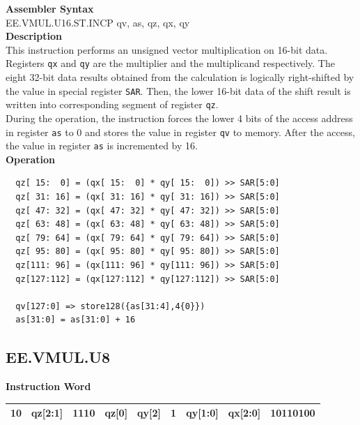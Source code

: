 \textbf{Assembler Syntax} \\
EE.VMUL.U16.ST.INCP qv, as, qz, qx, qy \\
\textbf{Description} \\
This instruction performs an unsigned vector multiplication on 16-bit data. Registers \lstinline{qx} and \lstinline{qy} are the multiplier and the multiplicand respectively. The eight 32-bit data results obtained from the calculation is logically right-shifted by the value in special register \lstinline{SAR}. Then, the lower 16-bit data of the shift result is written into corresponding segment of register \lstinline{qz}. \\ During the operation, the instruction forces the lower 4 bits of the access address in register \lstinline{as} to 0 and stores the value in register \lstinline{qv} to memory. After the access, the value in register \lstinline{as} is incremented by 16.\\
\textbf{Operation}
\begin{lstlisting}
  qz[ 15:  0] = (qx[ 15:  0] * qy[ 15:  0]) >> SAR[5:0]
  qz[ 31: 16] = (qx[ 31: 16] * qy[ 31: 16]) >> SAR[5:0]
  qz[ 47: 32] = (qx[ 47: 32] * qy[ 47: 32]) >> SAR[5:0]
  qz[ 63: 48] = (qx[ 63: 48] * qy[ 63: 48]) >> SAR[5:0]
  qz[ 79: 64] = (qx[ 79: 64] * qy[ 79: 64]) >> SAR[5:0]
  qz[ 95: 80] = (qx[ 95: 80] * qy[ 95: 80]) >> SAR[5:0]
  qz[111: 96] = (qx[111: 96] * qy[111: 96]) >> SAR[5:0]
  qz[127:112] = (qx[127:112] * qy[127:112]) >> SAR[5:0]

  qv[127:0] => store128({as[31:4],4{0}})
  as[31:0] = as[31:0] + 16
\end{lstlisting}

\clearpage
\subsection{EE.VMUL.U8}\label{instruction:EEVMULU8}
\setlength\tabcolsep{6pt}
\textbf{Instruction Word} \\
\begin{tabular}{|c|c|c|c|c|c|c|c|c|}
	\hline
	10 & qz[2:1] & 1110 & qz[0] & qy[2] & 1 & qy[1:0] & qx[2:0] & 10110100 \\
	\hline
\end{tabular}

